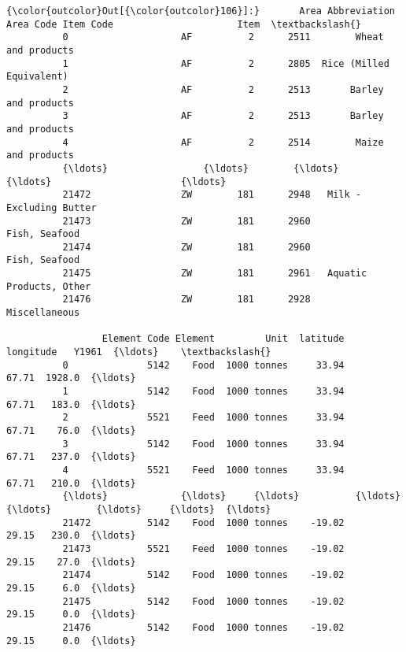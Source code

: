 \documentclass[11pt]{article}
\begin{document}
\begin{Verbatim}[commandchars=\\\{\}]
{\color{outcolor}Out[{\color{outcolor}106}]:}       Area Abbreviation  Area Code Item Code                      Item  \textbackslash{}
          0                    AF          2      2511        Wheat and products   
          1                    AF          2      2805  Rice (Milled Equivalent)   
          2                    AF          2      2513       Barley and products   
          3                    AF          2      2513       Barley and products   
          4                    AF          2      2514        Maize and products   
          {\ldots}                 {\ldots}        {\ldots}       {\ldots}                       {\ldots}   
          21472                ZW        181      2948   Milk - Excluding Butter   
          21473                ZW        181      2960             Fish, Seafood   
          21474                ZW        181      2960             Fish, Seafood   
          21475                ZW        181      2961   Aquatic Products, Other   
          21476                ZW        181      2928             Miscellaneous   
          
                 Element Code Element         Unit  latitude  longitude   Y1961  {\ldots}    \textbackslash{}
          0              5142    Food  1000 tonnes     33.94      67.71  1928.0  {\ldots}     
          1              5142    Food  1000 tonnes     33.94      67.71   183.0  {\ldots}     
          2              5521    Feed  1000 tonnes     33.94      67.71    76.0  {\ldots}     
          3              5142    Food  1000 tonnes     33.94      67.71   237.0  {\ldots}     
          4              5521    Feed  1000 tonnes     33.94      67.71   210.0  {\ldots}     
          {\ldots}             {\ldots}     {\ldots}          {\ldots}       {\ldots}        {\ldots}     {\ldots}  {\ldots}     
          21472          5142    Food  1000 tonnes    -19.02      29.15   230.0  {\ldots}     
          21473          5521    Feed  1000 tonnes    -19.02      29.15    27.0  {\ldots}     
          21474          5142    Food  1000 tonnes    -19.02      29.15     6.0  {\ldots}     
          21475          5142    Food  1000 tonnes    -19.02      29.15     0.0  {\ldots}     
          21476          5142    Food  1000 tonnes    -19.02      29.15     0.0  {\ldots}     
          

\end{Verbatim}
\end{document}
